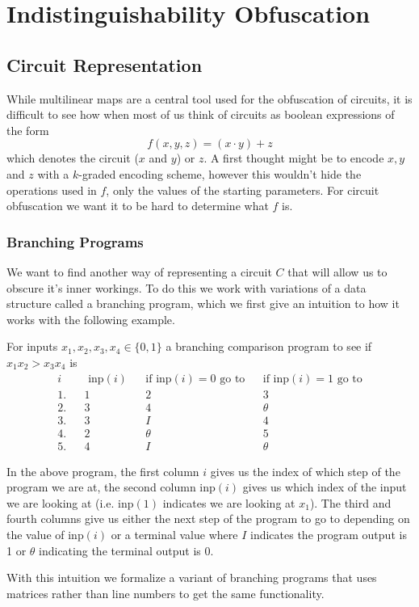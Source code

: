 \documentclass[12pt,twoside]{reedthesis}
\begin{document}
    
    
    
    
    \chapter{Indistinguishability Obfuscation}
    
    \section{Circuit Representation}
    While multilinear maps are a central tool used for the obfuscation of circuits, it is difficult to see how when most of us think of circuits as boolean expressions of the form
    $$f(x,y,z) = (x \cdot y) + z $$
    which denotes the circuit ($x$ and $y$) or $z$. A first thought might be to encode $x,y$ and $z$ with a $k$-graded encoding scheme, however this wouldn't hide the operations used in $f$, only the values of the starting parameters. For circuit obfuscation we want it to be hard to determine what $f$ is.
    
    \subsection{Branching Programs}
    
    \par We want to find another way of representing a circuit $C$ that will allow us to obscure it's inner workings. To do this we work with variations of a data structure called a branching program, which we first give an intuition to how it works with the following example.
      \par For inputs $x_1,x_2,x_3,x_4\in \{ 0 ,1\}$  a branching comparison program to see if $x_1x_2 > x_3x_4$ is
    \begin{align*}
    i &&\text{ inp}(i) &&\text{if inp}(i)=0 \text{ go to} &&\text{if inp}(i)=1 \text{ go to} \\
    1. &&1 &&2 &&3 \\
    2. &&3 &&4 &&\theta \\
    3. &&3 &&I &&4 \\
    4. &&2 &&\theta &&5 \\
    5. &&4 &&I &&\theta
    \end{align*}
    
    In the above program, the first column $i$ gives us the index of which step of the program we are at, the second column inp$(i)$ gives us which index of the input we are looking at (i.e. inp$(1)$ indicates we are looking at $x_1$). The third and fourth columns give us either the next step of the program to go to depending on the value of inp$(i)$ or a terminal value where $I$ indicates the program output is 1 or $\theta$ indicating the terminal output is 0.
    \par With this intuition we formalize a variant of branching programs that uses matrices rather than line numbers to get the same functionality.
\end{document}
